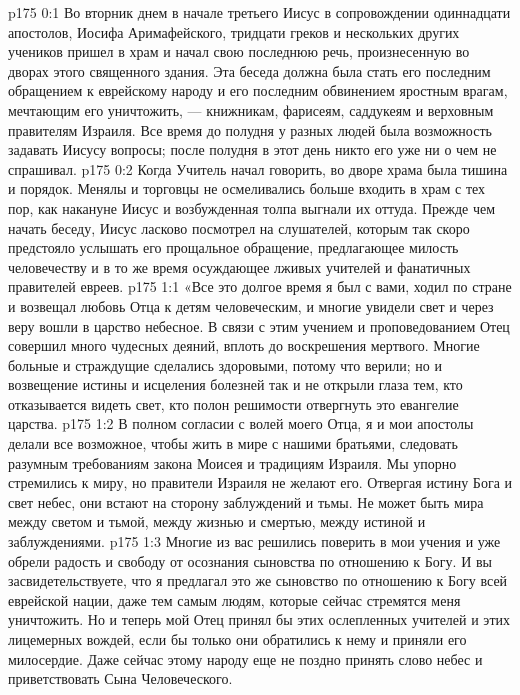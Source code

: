 \author{Комиссия срединников}
\vs p175 0:1 Во вторник днем в начале третьего Иисус в сопровождении одиннадцати апостолов, Иосифа Аримафейского, тридцати греков и нескольких других учеников пришел в храм и начал свою последнюю речь, произнесенную во дворах этого священного здания. Эта беседа должна была стать его последним обращением к еврейскому народу и его последним обвинением яростным врагам, мечтающим его уничтожить, --- книжникам, фарисеям, саддукеям и верховным правителям Израиля. Все время до полудня у разных людей была возможность задавать Иисусу вопросы; после полудня в этот день никто его уже ни о чем не спрашивал.
\vs p175 0:2 Когда Учитель начал говорить, во дворе храма была тишина и порядок. Менялы и торговцы не осмеливались больше входить в храм с тех пор, как накануне Иисус и возбужденная толпа выгнали их оттуда. Прежде чем начать беседу, Иисус ласково посмотрел на слушателей, которым так скоро предстояло услышать его прощальное обращение, предлагающее милость человечеству и в то же время осуждающее лживых учителей и фанатичных правителей евреев.
\vs p175 1:1 «Все это долгое время я был с вами, ходил по стране и возвещал любовь Отца к детям человеческим, и многие увидели свет и через веру вошли в царство небесное. В связи с этим учением и проповедованием Отец совершил много чудесных деяний, вплоть до воскрешения мертвого. Многие больные и страждущие сделались здоровыми, потому что верили; но и возвещение истины и исцеления болезней так и не открыли глаза тем, кто отказывается видеть свет, кто полон решимости отвергнуть это евангелие царства.
\vs p175 1:2 В полном согласии с волей моего Отца, я и мои апостолы делали все возможное, чтобы жить в мире с нашими братьями, следовать разумным требованиям закона Моисея и традициям Израиля. Мы упорно стремились к миру, но правители Израиля не желают его. Отвергая истину Бога и свет небес, они встают на сторону заблуждений и тьмы. Не может быть мира между светом и тьмой, между жизнью и смертью, между истиной и заблуждениями.
\vs p175 1:3 Многие из вас решились поверить в мои учения и уже обрели радость и свободу от осознания сыновства по отношению к Богу. И вы засвидетельствуете, что я предлагал это же сыновство по отношению к Богу всей еврейской нации, даже тем самым людям, которые сейчас стремятся меня уничтожить. Но и теперь мой Отец принял бы этих ослепленных учителей и этих лицемерных вождей, если бы только они обратились к нему и приняли его милосердие. Даже сейчас этому народу еще не поздно принять слово небес и приветствовать Сына Человеческого.

